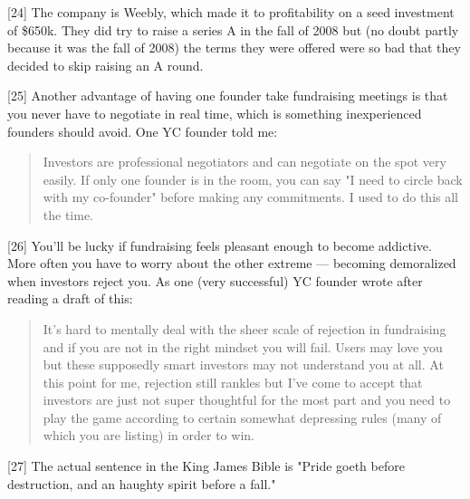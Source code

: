 [24] The company is Weebly, which made it to profitability on a
                  seed investment of \$650k. They did try to raise a series A in
                  the fall of 2008 but (no doubt partly because it was the fall
                  of 2008) the terms they were offered were so bad that they
                  decided to skip raising an A round.

[25] Another advantage of having one founder take fundraising
                  meetings is that you never have to negotiate in real time,
                  which is something inexperienced founders should avoid. One YC
                  founder told me:
                  \begin{quote}

                    Investors are professional negotiators and can negotiate on
                    the spot very easily. If only one founder is in the room,
                    you can say "I need to circle back with my co-founder"
                    before making any commitments. I used to do this all the
                    time.
                  
\end{quote}

                  [26] You'll be lucky if fundraising feels pleasant enough to
                  become addictive. More often you have to worry about the other
                  extreme --- becoming demoralized when investors reject
                  you. As one (very successful) YC founder wrote after reading a
                  draft of this:
                  \begin{quote}

                    It's hard to mentally deal with the sheer scale of rejection
                    in fundraising and if you are not in the right mindset you
                    will fail. Users may love you but these supposedly smart
                    investors may not understand you at all. At this point for
                    me, rejection still rankles but I've come to accept that
                    investors are just not super thoughtful for the most part
                    and you need to play the game according to certain somewhat
                    depressing rules (many of which you are listing) in order to
                    win.
                  
\end{quote}

                  [27] The actual sentence in the King James Bible is "Pride goeth
                  before destruction, and an haughty spirit before a fall."

